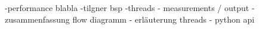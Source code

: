 -performance blabla
-tilgner bsp
-threads
- measurements / output
- zusammenfassung flow diagramm
- erläuterung threads
- python api





